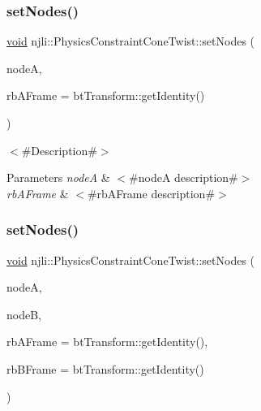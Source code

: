 \subsubsection{\texorpdfstring{set\+Nodes()}{setNodes()}\hspace{0.1cm}{\footnotesize\ttfamily [1/2]}}
{\footnotesize\ttfamily \mbox{\hyperlink{_thread_8h_af1e856da2e658414cb2456cb6f7ebc66}{void}} njli\+::\+Physics\+Constraint\+Cone\+Twist\+::set\+Nodes (\begin{DoxyParamCaption}\item[{\mbox{\hyperlink{classnjli_1_1_node}{Node}} $\ast$}]{nodeA,  }\item[{const bt\+Transform \&}]{rb\+A\+Frame = {\ttfamily btTransform\+:\+:getIdentity()} }\end{DoxyParamCaption})}

$<$\#\+Description\#$>$


\begin{DoxyParams}{Parameters}
{\em nodeA} & $<$\#nodeA description\#$>$ \\
\hline
{\em rb\+A\+Frame} & $<$\#rb\+A\+Frame description\#$>$ \\
\hline
\end{DoxyParams}
\mbox{\label{classnjli_1_1_physics_constraint_cone_twist_ade9557985d29d2dbef78d0dc232ed367}} 
\subsubsection{\texorpdfstring{set\+Nodes()}{setNodes()}\hspace{0.1cm}{\footnotesize\ttfamily [2/2]}}
{\footnotesize\ttfamily \mbox{\hyperlink{_thread_8h_af1e856da2e658414cb2456cb6f7ebc66}{void}} njli\+::\+Physics\+Constraint\+Cone\+Twist\+::set\+Nodes (\begin{DoxyParamCaption}\item[{\mbox{\hyperlink{classnjli_1_1_node}{Node}} $\ast$}]{nodeA,  }\item[{\mbox{\hyperlink{classnjli_1_1_node}{Node}} $\ast$}]{nodeB,  }\item[{const bt\+Transform \&}]{rb\+A\+Frame = {\ttfamily btTransform\+:\+:getIdentity()},  }\item[{const bt\+Transform \&}]{rb\+B\+Frame = {\ttfamily btTransform\+:\+:getIdentity()} }\end{DoxyParamCaption})}

